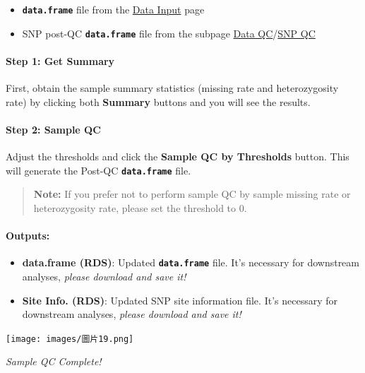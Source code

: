 \documentclass[
]{book}
\begin{document}
\begin{itemize}
\item
  {\textbf{\texttt{data.frame}}} file from the \ul{Data Input} page
\item
  SNP post-QC {\textbf{\texttt{data.frame}}} file from the subpage \ul{Data QC}/\ul{SNP QC}
\end{itemize}

\paragraph*{Step 1: Get Summary}\label{step-1-get-summary}

First, obtain the sample summary statistics (missing rate and heterozygosity rate) by clicking both {\textbf{Summary}} buttons and you will see the results.

\paragraph*{Step 2: Sample QC}\label{step-2-sample-qc}

Adjust the thresholds and click the {\textbf{Sample QC by Thresholds}} button. This will generate the Post-QC {\textbf{\texttt{data.frame}}} file.

\begin{quote}
\textbf{Note:} If you prefer not to perform sample QC by sample missing rate or heterozygosity rate, please set the threshold to 0.
\end{quote}

\paragraph*{Outputs:}\label{outputs-1}

\begin{itemize}
\item
  \textbf{data.frame (RDS)}: Updated {\textbf{\texttt{data.frame}}} file. It's necessary for downstream analyses, \emph{please download and save it!}
\item
  \textbf{Site Info. (RDS)}: Updated SNP site information file. It's necessary for downstream analyses, \emph{please download and save it!}
\end{itemize}

\texttt{[image: images/圖片19.png]}

\emph{Sample QC Complete!}
\end{document}
